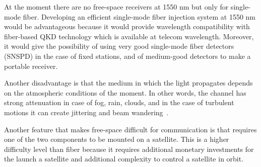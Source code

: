At the moment there are no free-space receivers at 1550 nm but only for single-mode fiber. Developing an efficient single-mode fiber injection system at 1550 nm would be advantageous because it would provide wavelength compatibility with fiber-based QKD technology which is available at telecom wavelength. Moreover, it would give the possibility of using very good single-mode fiber detectors (SNSPD) in the case of fixed stations, and of medium-good detectors to make a portable receiver.

Another disadvantage is that the medium in which the light propagates depends on the atmospheric conditions of the moment. In other words, the channel has strong attenuation in case of fog, rain, clouds, and in the case of turbulent motions it can create jittering and beam wandering~\cite{a25}.

Another feature that makes free-space difficult for communication is that requires one of the two components to be mounted on a satellite. This is a higher difficulty level than fiber because it requires additional monetary investments for the launch a satellite and additional complexity to control a satellite in orbit.